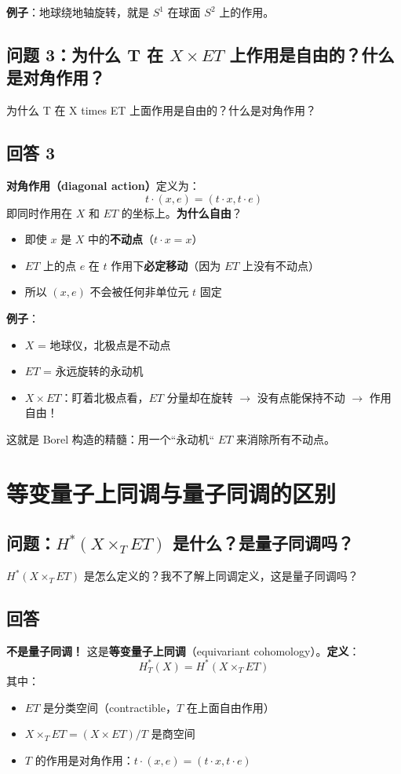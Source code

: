 \textbf{例子}：地球绕地轴旋转，就是 $S^1$ 在球面 $S^2$ 上的作用。
\subsection{问题 3：为什么 T 在 $X \times ET$ 上作用是自由的？什么是对角作用？}为什么 T 在 X times ET 上面作用是自由的？什么是对角作用？
\subsection{回答 3}\textbf{对角作用（diagonal action）}定义为：$$t \cdot (x, e) = (t \cdot x, t \cdot e)$$即同时作用在 $X$ 和 $ET$ 的坐标上。\textbf{为什么自由}？
\begin{itemize}
\item 即使 $x$ 是 $X$ 中的\textbf{不动点}（$t \cdot x = x$）
\item $ET$ 上的点 $e$ 在 $t$ 作用下\textbf{必定移动}（因为 $ET$ 上没有不动点）
\item 所以 $(x, e)$ 不会被任何非单位元 $t$ 固定
\end{itemize}

\textbf{例子}：
\begin{itemize}
\item $X$ = 地球仪，北极点是不动点
\item $ET$ = 永远旋转的永动机
\item $X \times ET$：盯着北极点看，$ET$ 分量却在旋转 $\rightarrow$ 没有点能保持不动 $\rightarrow$ 作用自由！
\end{itemize}

这就是 Borel 构造的精髓：用一个``永动机`` $ET$ 来消除所有不动点。
\section{等变量子上同调与量子同调的区别}\label{sec:EquivariantvsQuantum}
\subsection{问题：$H^*(X \times_T ET)$ 是什么？是量子同调吗？}$H^*(X \times_T ET)$ 是怎么定义的？我不了解上同调定义，这是量子同调吗？
\subsection{回答}
\textbf{不是量子同调！} 这是\textbf{等变量子上同调}（equivariant cohomology）。\textbf{定义}：$$H_T^*(X) = H^*(X \times_T ET)$$其中：
\begin{itemize}
\item $ET$ 是分类空间（contractible，$T$ 在上面自由作用）
\item $X \times_T ET = (X \times ET) / T$ 是商空间
\item $T$ 的作用是对角作用：$t \cdot (x, e) = (t \cdot x, t \cdot e)$
\end{itemize}

